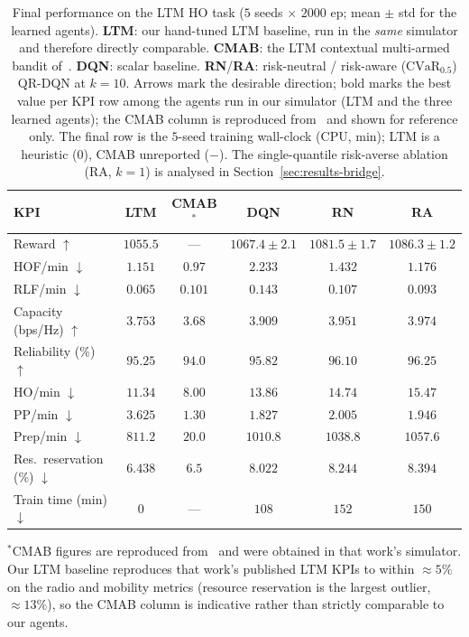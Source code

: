 \documentclass[conference]{IEEEtran}
\begin{document}
\begin{table}[t]
\caption{Final performance on the LTM HO task ($5$ seeds $\times$ $2000$ ep; mean $\pm$ std for the learned agents). \textbf{LTM}: our hand-tuned LTM baseline, run in the \emph{same} simulator and therefore directly comparable. \textbf{CMAB}: the LTM contextual multi-armed bandit of~\cite{cmab_ho}. \textbf{DQN}: scalar baseline. \textbf{RN}/\textbf{RA}: risk-neutral / risk-aware ($\mathrm{CVaR}_{0.5}$) QR-DQN at $k{=}10$. Arrows mark the desirable direction; bold marks the best value per KPI row among the agents run in our simulator (LTM and the three learned agents); the CMAB column is reproduced from~\cite{cmab_ho} and shown for reference only. The final row is the $5$-seed training wall-clock (CPU, min); LTM is a heuristic ($0$), CMAB unreported ($-$). The single-quantile risk-averse ablation (RA, $k{=}1$) is analysed in Section~\ref{sec:results-bridge}.}
\label{tab:final}
\begin{center}
\setlength{\tabcolsep}{5pt}
\begin{tabular}{|l|c|c|c|c|c|}
\hline
\textbf{KPI} & \textbf{LTM} & \textbf{CMAB}$^{*}$ & \textbf{DQN} & \textbf{RN} & \textbf{RA} \\
\hline
Reward $\uparrow$            & $1055.5$ & --- & $1067.4\pm2.1$ & $1081.5\pm1.7$ & $\mathbf{1086.3\pm1.2}$ \\
HOF/min $\downarrow$         & $\mathbf{1.151}$ & $0.97$ & $2.233$ & $1.432$ & $1.176$ \\
RLF/min $\downarrow$         & $\mathbf{0.065}$ & $0.101$ & $0.143$ & $0.107$ & $0.093$ \\
Capacity (bps/Hz) $\uparrow$ & $3.753$ & $3.68$ & $3.909$ & $3.951$ & $\mathbf{3.974}$ \\
Reliability (\%) $\uparrow$  & $95.25$ & $94.0$ & $95.82$ & $96.10$ & $\mathbf{96.25}$ \\
HO/min $\downarrow$          & $\mathbf{11.34}$ & $8.00$ & $13.86$ & $14.74$ & $15.47$ \\
PP/min $\downarrow$          & $3.625$ & $1.30$ & $\mathbf{1.827}$ & $2.005$ & $1.946$ \\
Prep/min $\downarrow$        & $\mathbf{811.2}$ & $20.0$ & $1010.8$ & $1038.8$ & $1057.6$ \\
Res.\ reservation (\%) $\downarrow$ & $\mathbf{6.438}$ & $6.5$ & $8.022$ & $8.244$ & $8.394$ \\
\hline
Train time (min) $\downarrow$ & $0$ & --- & $108$ & $152$ & $150$ \\
\hline
\end{tabular}
\end{center}
{\footnotesize $^{*}$CMAB figures are reproduced from~\cite{cmab_ho} and were obtained in that work's simulator. Our LTM baseline reproduces that work's published LTM KPIs to within $\approx 5\%$ on the radio and mobility metrics (resource reservation is the largest outlier, $\approx 13\%$), so the CMAB column is indicative rather than strictly comparable to our agents.}
\end{table}
\end{document}
